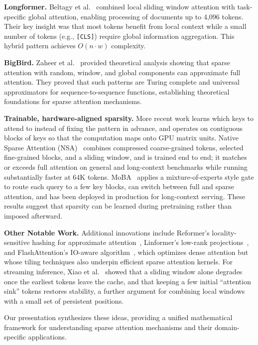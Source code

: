 \documentclass{article}
\begin{document}
\textbf{Longformer.} Beltagy et al.~\cite{beltagy2020longformer} combined local sliding window attention with task-specific global attention, enabling processing of documents up to 4,096 tokens. Their key insight was that most tokens benefit from local context while a small number of tokens (e.g., \texttt{[CLS]}) require global information aggregation. This hybrid pattern achieves \(O(n \cdot w)\) complexity.

\textbf{BigBird.} Zaheer et al.~\cite{zaheer2020big} provided theoretical analysis showing that sparse attention with random, window, and global components can approximate full attention. They proved that such patterns are Turing complete and universal approximators for sequence-to-sequence functions, establishing theoretical foundations for sparse attention mechanisms.

\textbf{Trainable, hardware-aligned sparsity.} More recent work learns which keys to attend to instead of fixing the pattern in advance, and operates on contiguous blocks of keys so that the computation maps onto GPU matrix units. Native Sparse Attention (NSA)~\cite{yuan2025nsa} combines compressed coarse-grained tokens, selected fine-grained blocks, and a sliding window, and is trained end to end; it matches or exceeds full attention on general and long-context benchmarks while running substantially faster at 64K tokens. MoBA~\cite{lu2025moba} applies a mixture-of-experts style gate to route each query to a few key blocks, can switch between full and sparse attention, and has been deployed in production for long-context serving. These results suggest that sparsity can be learned during pretraining rather than imposed afterward.

\textbf{Other Notable Work.} Additional innovations include Reformer's locality-sensitive hashing for approximate attention~\cite{kitaev2020reformer}, Linformer's low-rank projections~\cite{wang2020linformer}, and FlashAttention's IO-aware algorithm~\cite{dao2022flashattention}, which optimizes dense attention but whose tiling techniques also underpin efficient sparse attention kernels. For streaming inference, Xiao et al.~\cite{xiao2024streaming} showed that a sliding window alone degrades once the earliest tokens leave the cache, and that keeping a few initial ``attention sink'' tokens restores stability, a further argument for combining local windows with a small set of persistent positions.

Our presentation synthesizes these ideas, providing a unified mathematical framework for understanding sparse attention mechanisms and their domain-specific applications.
\end{document}
